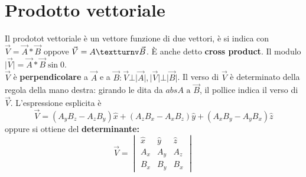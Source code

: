 \documentclass{book}
\newcommand{\abs}[1]{\lvert#1\rvert}
\begin{document}
\section{Prodotto vettoriale}
Il prodotot vettoriale è un vettore funzione di due vettori, è si indica con $\vec{V}=\vec{A}*\vec{B}$ oppove
$\vec{V}=A\textturnv \vec{B}$. È anche detto \textbf{cross product}. Il modulo
$\abs{\vec{V}}=\vec{A}*\vec{B}\sin0$.\\
$\vec{V}$ è \textbf{perpendicolare} a $\vec{A}$ e a
$\vec{B}:\vec{V}\bot \abs{\vec{A}},\abs{\vec{V}}\bot\abs{\vec{B}}$. Il verso di $\vec{V}$ è determinato della
regola della mano destra: girando le dita da $abs{A} \text { a } \vec{B}$, il pollice indica il verso di $\vec{V}$. L'espressione esplicita è
\begin{equation}
  \vec{V}=(A_yB_z-A_zB_y)\hat{x}+(A_zB_x-A_xB_z)\hat{y}+(A_xB_y-A_yB_x)\hat{z}
\end{equation}
oppure si ottiene del \textbf{determinante:}
\begin{equation}
  \vec{V}=\begin{vmatrix}
            \hat{x}&\hat{y}&\hat{z}\\
            A_x&A_y&A_z\\
            B_x&B_y&B_x
          \end{vmatrix}
\end{equation}
\end{document}
